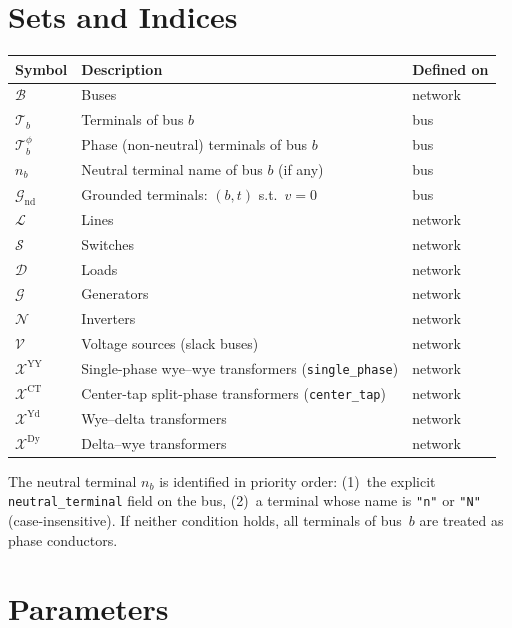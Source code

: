 \documentclass[11pt,a4paper]{article}
\newcommand{\mc}[1]{\mathcal{#1}}
\begin{document}
\section{Sets and Indices}

\begin{center}
\renewcommand{\arraystretch}{1.25}
\begin{tabular}{@{}lll@{}}
\toprule
Symbol & Description & Defined on \\
\midrule
$\mc{B}$           & Buses & network \\
$\mc{T}_b$         & Terminals of bus $b$ & bus \\
$\mc{T}_b^\phi$    & Phase (non-neutral) terminals of bus $b$ & bus \\
$n_b$              & Neutral terminal name of bus $b$ (if any) & bus \\
$\mc{G}_\text{nd}$ & Grounded terminals: $(b,t)$ s.t.\ $v=0$ & bus \\
$\mc{L}$           & Lines & network \\
$\mc{S}$           & Switches & network \\
$\mc{D}$           & Loads & network \\
$\mc{G}$           & Generators & network \\
$\mc{N}$           & Inverters & network \\
$\mc{V}$           & Voltage sources (slack buses) & network \\
$\mc{X}^\text{YY}$ & Single-phase wye--wye transformers (\texttt{single\_phase}) & network \\
$\mc{X}^\text{CT}$ & Center-tap split-phase transformers (\texttt{center\_tap}) & network \\
$\mc{X}^\text{Yd}$ & Wye--delta transformers & network \\
$\mc{X}^\text{Dy}$ & Delta--wye transformers & network \\
\bottomrule
\end{tabular}
\end{center}

The neutral terminal $n_b$ is identified in priority order:
(1)~the explicit \texttt{neutral\_terminal} field on the bus,
(2)~a terminal whose name is \texttt{"n"} or \texttt{"N"} (case-insensitive).
If neither condition holds, all terminals of bus~$b$ are treated as phase
conductors.

\section{Parameters}
\end{document}
